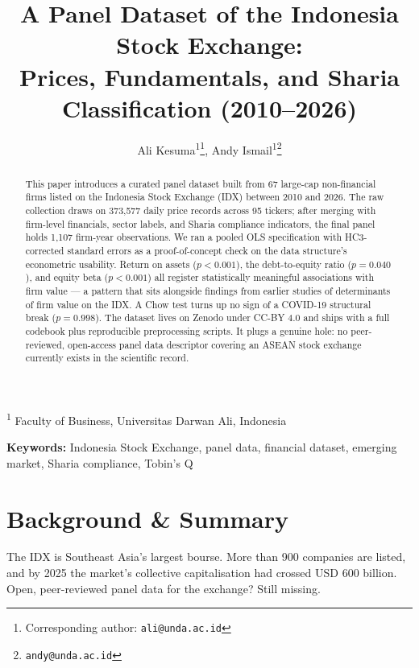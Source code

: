 \documentclass[11pt,a4paper]{article}
\title{\textbf{A Panel Dataset of the Indonesia Stock Exchange:\\
Prices, Fundamentals, and Sharia Classification (2010--2026)}}
\author{
  Ali Kesuma\textsuperscript{1}\thanks{Corresponding author: \texttt{ali@unda.ac.id}},
  Andy Ismail\textsuperscript{1}\thanks{\texttt{andy@unda.ac.id}}
}
\date{}
\begin{document}
\maketitle

\noindent\textsuperscript{1} Faculty of Business, Universitas Darwan Ali, Indonesia

\noindent\textbf{Keywords:} Indonesia Stock Exchange, panel data, financial dataset, emerging market, Sharia compliance, Tobin's Q

\begin{abstract}
\noindent
This paper introduces a curated panel dataset built from 67 large-cap non-financial firms listed on the Indonesia Stock Exchange (IDX) between 2010 and 2026. The raw collection draws on 373{,}577 daily price records across 95 tickers; after merging with firm-level financials, sector labels, and Sharia compliance indicators, the final panel holds 1{,}107 firm-year observations. We ran a pooled OLS specification with HC3-corrected standard errors as a proof-of-concept check on the data structure's econometric usability. Return on assets ($p < 0.001$), the debt-to-equity ratio ($p = 0.040$), and equity beta ($p < 0.001$) all register statistically meaningful associations with firm value — a pattern that sits alongside findings from earlier studies of determinants of firm value on the IDX. A Chow test turns up no sign of a COVID-19 structural break ($p = 0.998$). The dataset lives on Zenodo under CC-BY 4.0 and ships with a full codebook plus reproducible preprocessing scripts. It plugs a genuine hole: no peer-reviewed, open-access panel data descriptor covering an ASEAN stock exchange currently exists in the scientific record.
\end{abstract}

\section{Background \& Summary}

The IDX is Southeast Asia's largest bourse. More than 900 companies are listed, and by 2025 the market's collective capitalisation had crossed USD 600 billion. Open, peer-reviewed panel data for the exchange? Still missing.
\end{document}
